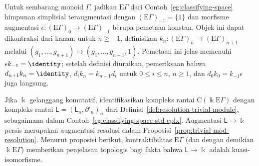 \begin{example}\label{eg:classifying-contractible}
	Untuk sembarang monoid $\Gamma$, jadikan $\mathrm{E}\Gamma$ dari
	Contoh~\ref{eg:classifying-space} himpunan simplisial teraugmentasi dengan
	$(\mathrm{E}\Gamma)_{-1}=\{1\}$ dan morfisme augmentasi
	$\epsilon:(\mathrm{E}\Gamma)_0\to(\mathrm{E}\Gamma)_{-1}$ berupa pemetaan
	konstan. Objek ini dapat dikontraksi dari kanan: untuk $n\geq-1$,
	definisikan
	$k_n:(\mathrm{E}\Gamma)_n\to(\mathrm{E}\Gamma)_{n+1}$ melalui
	$(g_1,\ldots,g_{n+1})\mapsto(g_1,\ldots,g_{n+1},1)$.
	Pemetaan ini jelas memenuhi $\epsilon k_{-1}=\identity$; setelah
	definisi diuraikan, pemeriksaan bahwa
	$d_{n+1}k_n=\identity$,
	$d_ik_n=k_{n-1}d_i$ untuk $0\leq i\leq n$, $n\geq1$, dan
	$d_0k_0=k_{-1}\epsilon$ juga langsung.

	Jika $\Bbbk$ gelanggang komutatif, identifikasikan kompleks rantai
	$\mathrm{C}(\Bbbk\mathrm{E}\Gamma)$ dengan kompleks rantai
	$\mathsf{L}=(\mathsf{L}_n,\partial'_n)_n$ dari
	Definisi~\ref{def:resolution-trivial-module}, sebagaimana dalam
	Contoh~\ref{eg:classifying-space-std-cplx}. Augmentasi
	$\mathsf{L}\to\Bbbk$ persis merupakan augmentasi resolusi dalam
	Proposisi~\ref{prop:trivial-mod-resolution}. Menurut proposisi berikut,
	kontraktibilitas $\mathrm{E}\Gamma$ (dan dengan
	demikian $\Bbbk\mathrm{E}\Gamma$) memberikan penjelasan topologis bagi
	fakta bahwa $\mathsf{L}\to\Bbbk$ adalah kuasi-isomorfisme.
\end{example}


